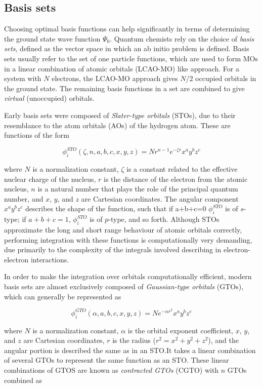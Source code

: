 \begin{doublespace}
\subsection{Basis sets}

Choosing optimal basis functions can help significantly in terms of determining
the ground state wave function $\Psi_0$. Quantum chemists rely on the choice of
\emph{basis sets}, defined as the vector space in which an ab initio problem is
defined. Basis sets usually refer to the set of one particle functions, which
are used to form MOs in a linear combination of atomic orbitals (LCAO-MO) like
approach. For a system with $N$ electrons, the LCAO-MO approach gives $N$/2
occupied orbitals in the ground state. The remaining basis functions in a set
are combined to give \emph{virtual} (unoccupied) orbitals.

Early basis sets were composed of \emph{Slater-type orbitals} (STOs), due to
their resemblance to the atom orbitals (AOs) of the hydrogen atom. These are
functions of the form

\begin{equation}
\phi_i^{STO}(\zeta,n,a,b,c,x,y,z) = Nr^{n-1}e^{-\zeta r}x^a y^b z^c
\end{equation}

\noindent where $N$ is a normalization constant, $\zeta$ is a constant related
to the effective nuclear charge of the nucleus, $r$ is the distance of the
electron from the atomic nucleus, $n$ is a natural number that plays the role
of the principal quantum number, and $x$, $y$, and $z$ are Cartesian
coordinates. The angular component $x^a y^b z^c$ describes the shape of the
function, such that if a+b+c=0 $\phi_i^{STO}$ is of $s$-type; if $a+b+c=1$,
$\phi_i^{STO}$ is of $p$-type, and so forth. Although STOs approximate the long
and short range behaviour of atomic orbitals correctly, performing integration
with these functions is computationally very demanding, due primarily to the
complexity of the integrals involved describing in electron-electron
interactions.

In order to make the integration over orbitals computationally efficient,
modern basis sets are almost exclusively composed of \emph{Gaussian-type
orbitals} (GTOs), which can generally be represented as

\begin{equation}
\phi_i^{GTO}(\alpha,a,b,c,x,y,z) = N e^{-\alpha r^2} x^a y^b z^c
\end{equation}

\noindent where $N$ is a normalization constant, $\alpha$ is the orbital
exponent coefficient, $x$, $y$, and $z$ are Cartesian coordinates, $r$ is the
radius ($r^2=x^2+y^2+z^2$), and the angular portion is described the same as in
an STO.\@ It takes a linear combination of several GTOs to represent the same
function as an STO. These linear combinations of GTOS are known as
\emph{contracted GTOs} (CGTO) with $n$ GTOs combined as


\end{doublespace}
